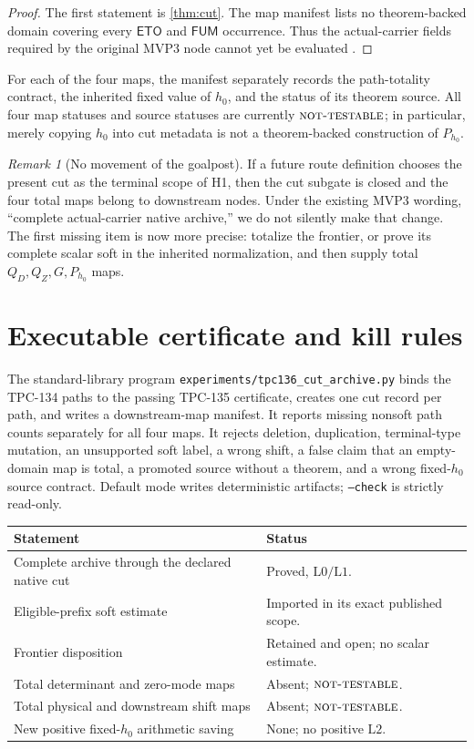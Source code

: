\documentclass[11pt]{article}
\theoremstyle{definition}
\theoremstyle{remark}
\newtheorem{remark}[theorem]{Remark}
\newcommand{\Lzero}{\mathrm{L0}}
\newcommand{\Lone}{\mathrm{L1}}
\newcommand{\Ltwo}{\mathrm{L2}}
\newcommand{\NT}{\textsc{not-testable}}
\begin{document}
\begin{proof}
The first statement is \cref{thm:cut}.  The map manifest lists no
theorem-backed domain covering every \(\mathsf{ETO}\) and
\(\mathsf{FUM}\) occurrence.  Thus the actual-carrier fields required
by the original MVP3 node cannot yet be evaluated
\citep{WangTPC132}.
\end{proof}

For each of the four maps, the manifest separately records the
path-totality contract, the inherited fixed value of \(h_0\), and the
status of its theorem source.  All four map statuses and source
statuses are currently \(\NT\); in particular, merely copying
\(h_0\) into cut metadata is not a theorem-backed construction of
\(P_{h_0}\).

\begin{remark}[No movement of the goalpost]
If a future route definition chooses the present cut as the terminal
scope of H1, then the cut subgate is closed and the four total maps
belong to downstream nodes.  Under the existing MVP3 wording,
``complete actual-carrier native archive,'' we do not silently make
that change.  The first missing item is now more precise: totalize the
frontier, or prove its complete scalar soft in the inherited
normalization, and then supply total \(Q_D,Q_Z,G,P_{h_0}\) maps.
\end{remark}

\section{Executable certificate and kill rules}

The standard-library program
\texttt{experiments/tpc136\_cut\_archive.py} binds the TPC-134 paths
to the passing TPC-135 certificate, creates one cut record per path,
and writes a downstream-map manifest.  It reports missing nonsoft
path counts separately for all four maps.  It rejects deletion,
duplication, terminal-type mutation, an unsupported soft label, a
wrong shift, a false claim that an empty-domain map is total, a
promoted source without a theorem, and a wrong fixed-\(h_0\) source
contract.
Default mode writes deterministic artifacts; \texttt{--check} is
strictly read-only.

\begin{center}
\small
\begin{tabularx}{\textwidth}{@{}P{0.43\textwidth}Y@{}}
\toprule
Statement & Status\\
\midrule
Complete archive through the declared native cut
& Proved, \(\Lzero/\Lone\).\\
Eligible-prefix soft estimate
& Imported in its exact published scope.\\
Frontier disposition
& Retained and open; no scalar estimate.\\
Total determinant and zero-mode maps
& Absent; \(\NT\).\\
Total physical and downstream shift maps
& Absent; \(\NT\).\\
New positive fixed-\(h_0\) arithmetic saving
& None; no positive \(\Ltwo\).\\
\bottomrule
\end{tabularx}
\end{center}
\end{document}
